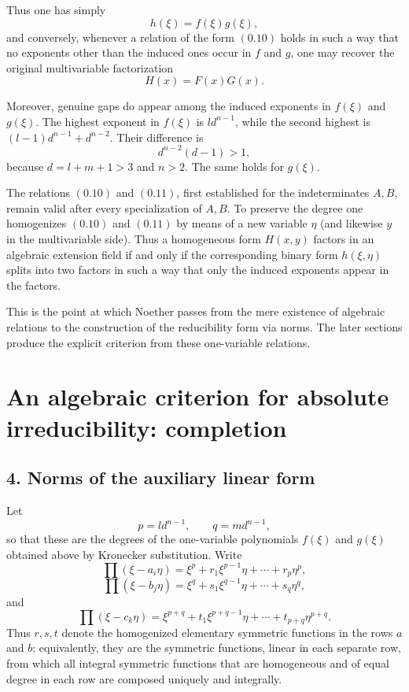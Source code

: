 \documentclass[11pt]{article}
\begin{document}
Thus one has simply
\[
h(\xi)=f(\xi)g(\xi),
\tag{0.10}
\]
and conversely, whenever a relation of the form \((0.10)\) holds in such a way that no exponents other than the induced ones occur in $f$ and $g$, one may recover the original multivariable factorization
\[
H(x)=F(x)G(x).
\tag{0.11}
\]

Moreover, genuine gaps do appear among the induced exponents in $f(\xi)$ and $g(\xi)$. The highest exponent in $f(\xi)$ is $l d^{n-1}$, while the second highest is $(l-1)d^{n-1}+d^{n-2}$. Their difference is
\[
d^{n-2}(d-1)>1,
\]
because $d=l+m+1>3$ and $n>2$. The same holds for $g(\xi)$.

The relations \((0.10)\) and \((0.11)\), first established for the indeterminates $A,B$, remain valid after every specialization of $A,B$. To preserve the degree one homogenizes \((0.10)\) and \((0.11)\) by means of a new variable $\eta$ (and likewise $y$ in the multivariable side). Thus a homogeneous form $H(x,y)$ factors in an algebraic extension field if and only if the corresponding binary form $h(\xi,\eta)$ splits into two factors in such a way that only the induced exponents appear in the factors.

This is the point at which Noether passes from the mere existence of algebraic relations to the construction of the reducibility form via norms. The later sections produce the explicit criterion from these one-variable relations.

\clearpage

\section{An algebraic criterion for absolute irreducibility: completion}

\subsection*{4. Norms of the auxiliary linear form}

Let
\[
  p = l d^{n-1}, \qquad q = m d^{n-1},
\]
so that these are the degrees of the one-variable polynomials $f(\xi)$ and $g(\xi)$ obtained above by Kronecker substitution. Write
\[
  \prod (\xi-a_i\eta)=\xi^p+r_1\xi^{p-1}\eta+\cdots+r_p\eta^p,
\]
\[
  \prod (\xi-b_j\eta)=\xi^q+s_1\xi^{q-1}\eta+\cdots+s_q\eta^q,
\]
and
\[
  \prod (\xi-c_k\eta)=\xi^{p+q}+t_1\xi^{p+q-1}\eta+\cdots+t_{p+q}\eta^{p+q}.
\]
Thus $r,s,t$ denote the homogenized elementary symmetric functions in the rows $a$ and $b$; equivalently, they are the symmetric functions, linear in each separate row, from which all integral symmetric functions that are homogeneous and of equal degree in each row are composed uniquely and integrally.
\end{document}
